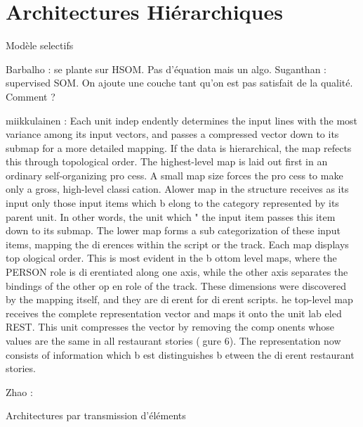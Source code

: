 
    

\section{Architectures Hiérarchiques}
Modèle  selectifs

Barbalho : se plante sur HSOM. Pas d'équation mais un algo.
Suganthan : supervised SOM. On ajoute une couche tant qu'on est pas satisfait de la qualité. Comment ?


miikkulainen : 
Each unit indep endently determines the input lines with the most variance among its input vectors, and passes a compressed vector down to its submap for a more detailed mapping.
If the data is hierarchical, the map refects this through topological order.
The highest-level map is laid out first in an ordinary self-organizing pro cess. A small map size forces the pro cess to make only a gross, high-level classication. Alower map in the structure receives as its input only those input items which b elong to the category represented by its parent unit. In other words, the unit which \wins" the input item passes this item down to its submap. The lower map forms a sub categorization of these input items, mapping the dierences within the script or the track. Each map displays top ological order. This is most evident in the b ottom level maps, where the PERSON role is dierentiated along one axis, while the other axis separates the bindings of the other op en role of the track. These dimensions were discovered by the mapping itself, and they are dierent for dierent scripts.
he top-level map receives the complete representation vector and maps it onto the unit lab eled REST. This unit compresses the vector by removing the comp onents whose values are the same in all restaurant stories (gure 6). The representation now consists of information which b est distinguishes b etween the dierent restaurant stories.


Zhao : 

Architectures par transmission d'éléments

